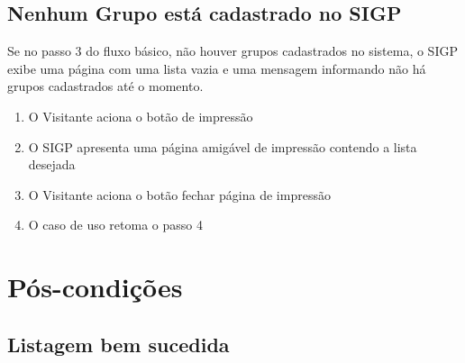 \documentclass[11pt, a4paper,oneside]{book}
\begin{document}
\subsection{Nenhum Grupo está cadastrado no SIGP}
Se no passo $3$ do fluxo básico, não houver grupos cadastrados no sistema, o SIGP exibe uma página com uma lista vazia e uma mensagem informando não há grupos cadastrados até o momento.

\begin{enumerate}
\item O Visitante aciona o botão de impressão
\item O SIGP apresenta uma página amigável de impressão contendo a lista desejada
\item O Visitante aciona o botão fechar página de impressão
\item O caso de uso retoma o passo 4
\end{enumerate}

%
%
%
%

\section{Pós-condições}

\subsection{Listagem bem sucedida}
\end{document}

